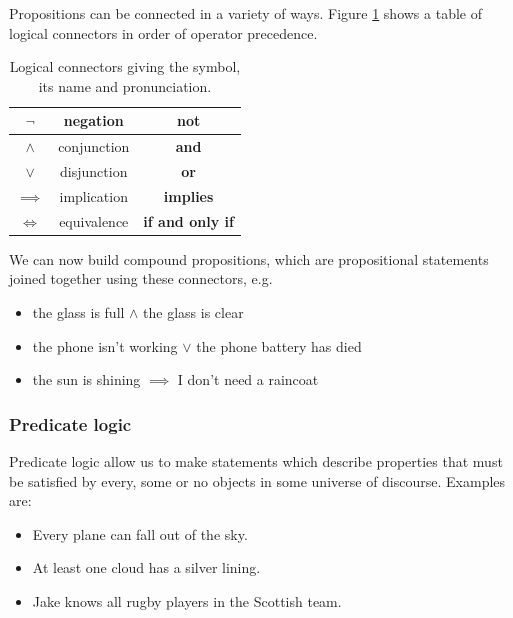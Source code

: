 Propositions can be connected in a variety of ways. Figure \ref{tab:logcon} shows a table of logical connectors in order of operator precedence.

\begin{table}[H]
\centering
\begin{tabular}{| c | c | c |}
\hline
$\neg$ & negation & \textbf{not} \\
\hline
$\land$ & conjunction & \textbf{and} \\
\hline
$\lor$ & disjunction & \textbf{or} \\
\hline
$\implies$ & implication & \textbf{implies} \\
\hline
$\Leftrightarrow$ & equivalence & \textbf{if and only if} \\
\hline
\end{tabular}
\caption{Logical connectors giving the symbol, its name and pronunciation. \label{tab:logcon}}
\end{table}

We can now build compound propositions, which are propositional statements joined together using these connectors, e.g.

\begin{itemize}
\item the glass is full $\land$ the glass is clear

\item the phone isn't working $\lor$ the phone battery has died

\item the sun is shining $\implies$ I don't need a raincoat
\end{itemize}

\subsubsection{Predicate logic}

Predicate logic allow us to make statements which describe properties that must be satisfied by every, some or no objects in some universe of discourse. Examples are:

\begin{itemize}
\item Every plane can fall out of the sky.

\item At least one cloud has a silver lining.

\item Jake knows all rugby players in the Scottish team.
\end{itemize}

